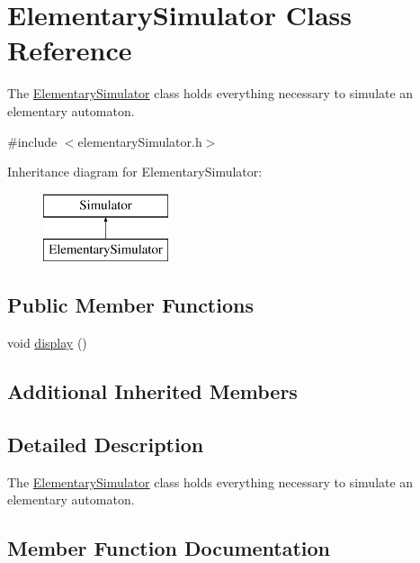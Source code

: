 \hypertarget{class_elementary_simulator}{}\section{Elementary\+Simulator Class Reference}
\label{class_elementary_simulator}


The \mbox{\hyperlink{class_elementary_simulator}{Elementary\+Simulator}} class holds everything necessary to simulate an elementary automaton.  




{\ttfamily \#include $<$elementary\+Simulator.\+h$>$}

Inheritance diagram for Elementary\+Simulator\+:\begin{figure}[H]
\begin{center}
\leavevmode
\includegraphics[height=2.000000cm]{class_elementary_simulator}
\end{center}
\end{figure}
\subsection*{Public Member Functions}
\begin{DoxyCompactItemize}
\item 
void \mbox{\hyperlink{class_elementary_simulator_ac12315c72e09d7b96e6652db8867e39a}{display}} ()
\end{DoxyCompactItemize}
\subsection*{Additional Inherited Members}


\subsection{Detailed Description}
The \mbox{\hyperlink{class_elementary_simulator}{Elementary\+Simulator}} class holds everything necessary to simulate an elementary automaton. 

\subsection{Member Function Documentation}
\mbox{\label{class_elementary_simulator_ac12315c72e09d7b96e6652db8867e39a}} 
